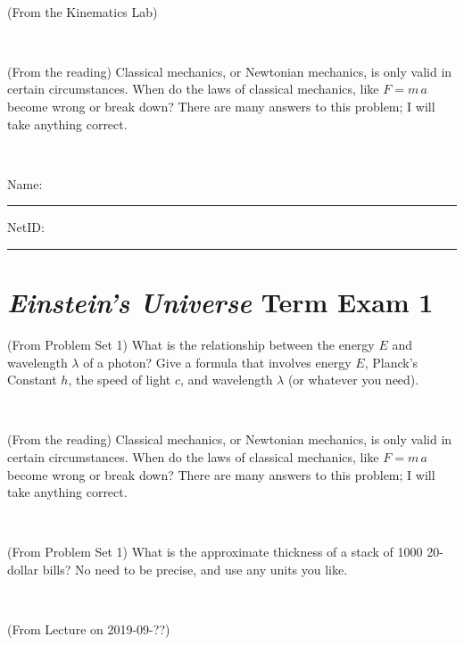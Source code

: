 \documentclass[12pt, letterpaper]{article}
\begin{document}
\vfill ~

\begin{problem} (From the Kinematics Lab)

\end{problem}


\vfill ~

\begin{problem} (From the reading)
Classical mechanics, or Newtonian mechanics, is only valid in certain
circumstances. When do the laws of classical mechanics, like $F =
m\,a$ become wrong or break down? There are many answers to this
problem; I will take anything correct.
\end{problem}


\vfill ~


\cleardoublepage



\noindent
Name: \rule[-1ex]{0.60\textwidth}{0.1pt}
NetID: \rule[-1ex]{0.20\textwidth}{0.1pt}

\section*{\textsl{Einstein's Universe} Term Exam 1}
\setcounter{problem}{1}


\begin{problem} (From Problem Set 1)
What is the relationship between the energy $E$ and wavelength
$\lambda$ of a photon? Give a formula that involves energy $E$,
Planck's Constant $h$, the speed of light $c$, and wavelength
$\lambda$ (or whatever you need).
\end{problem}

\vfill ~

\begin{problem} (From the reading)
Classical mechanics, or Newtonian mechanics, is only valid in certain
circumstances. When do the laws of classical mechanics, like $F =
m\,a$ become wrong or break down? There are many answers to this
problem; I will take anything correct.
\end{problem}


\vfill ~

\begin{problem} (From Problem Set 1)
What is the approximate thickness of a stack of 1000 20-dollar bills?
No need to be precise, and use any units you like.
\end{problem}


\vfill ~

\begin{problem} (From Lecture on 2019-09-??)
\end{problem}
\end{document}
